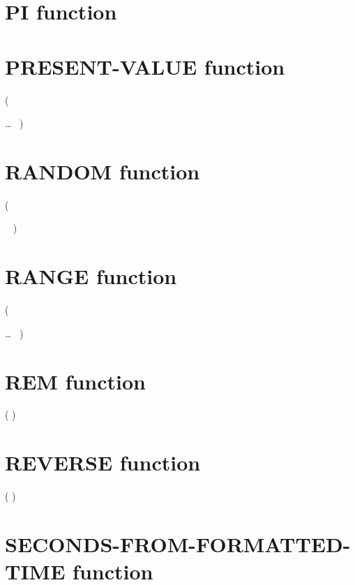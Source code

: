 \section{PI function}

 

\section{PRESENT-VALUE function}

  (
\begin{1=}
  \argument
\end{1=} \ldots
\ {})

\section{RANDOM function}

 
\begin{0-1}
  (
  \begin{0-1}
    \argument
  \end{0-1} \gnucobol{\ldots}\ {}
  )
\end{0-1}

\section{RANGE function}

  (
\begin{1=}
  \argument
\end{1=}\ldots
\ {})

\section{REM function}

  ( \argument \argument )

\section{REVERSE function}

  ( \argument )

\section{SECONDS-FROM-FORMATTED-TIME function}

 

